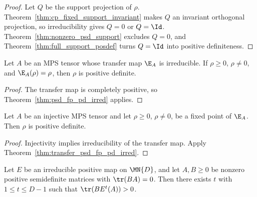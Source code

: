 \begin{proof}
    \leanok
    Let $Q$ be the support projection of $\rho$.
    Theorem~\ref{thm:cp_fixed_support_invariant} makes $Q$ an invariant
    orthogonal projection, so irreducibility gives $Q=0$ or $Q=\Id$.
    Theorem~\ref{thm:nonzero_psd_support} excludes $Q=0$, and
    Theorem~\ref{thm:full_support_posdef} turns $Q=\Id$ into positive
    definiteness.
\end{proof}

\begin{theorem}
    \label{thm:transfer_psd_fp_pd_irred}
    \leanok
    Let $A$ be an MPS tensor whose transfer map $\E_A$ is irreducible. If
    $\rho\geq0$, $\rho\neq0$, and $\E_A(\rho)=\rho$, then $\rho$ is positive
    definite.
\end{theorem}

\begin{proof}
    \leanok
    The transfer map is completely positive, so
    Theorem~\ref{thm:psd_fp_pd_irred} applies.
\end{proof}

\begin{theorem}
    \label{thm:psd_fp_pd}
    \leanok
    Let $A$ be an injective MPS tensor and let $\rho \ge 0$,
    $\rho \neq 0$, be a fixed point of $\E_A$. Then $\rho$ is positive
    definite.
\end{theorem}

\begin{proof}\leanok
    Injectivity implies irreducibility of the transfer map. Apply
    Theorem~\ref{thm:transfer_psd_fp_pd_irred}.
\end{proof}

\begin{theorem}\label{thm:orthogonal_trace_cond}
    \leanok
    Let $E$ be an irreducible positive map on $\MN{D}$,
    and let $A, B \ge 0$ be nonzero positive semidefinite matrices
    with $\tr(BA) = 0$.
    Then there exists $t$ with $1 \le t \le D - 1$ such that
    $\tr(BE^t(A)) > 0$.
\end{theorem}

